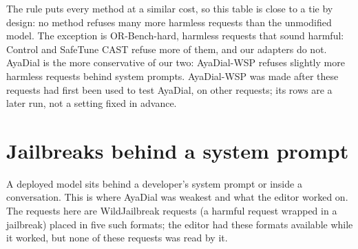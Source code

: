 \documentclass[10pt,a4paper]{article}
\begin{document}
The rule puts every method at a similar cost, so this table is close to a tie by design: no method refuses many more harmless requests than the unmodified model. The exception is OR-Bench-hard, harmless requests that sound harmful: Control and SafeTune CAST refuse more of them, and our adapters do not. AyaDial is the more conservative of our two: AyaDial-WSP refuses slightly more harmless requests behind system prompts. AyaDial-WSP was made after these requests had first been used to test AyaDial, on other requests; its rows are a later run, not a setting fixed in advance.
\section{Jailbreaks behind a system prompt}\label{sec:r-sys}
A deployed model sits behind a developer's system prompt or inside a conversation. This is where AyaDial was weakest and what the editor worked on. The requests here are WildJailbreak requests (a harmful request wrapped in a jailbreak) placed in five such formats; the editor had these formats available while it worked, but none of these requests was read by it.
\end{document}
